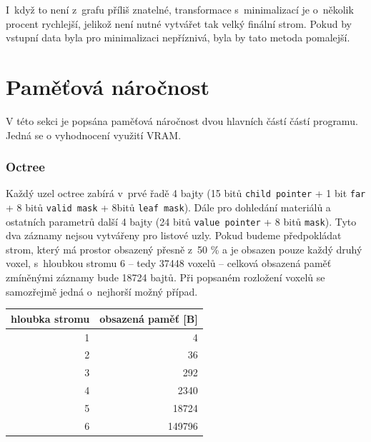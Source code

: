 I~když to není z~grafu příliš znatelné, transformace s~minimalizací je o~několik procent rychlejší, jelikož není nutné vytvářet tak velký finální strom. Pokud by vstupní data byla pro minimalizaci nepříznivá, byla by tato metoda pomalejší.

\section{Paměťová náročnost}
V této sekci je popsána paměťová náročnost dvou hlavních částí částí programu. Jedná se o vyhodnocení využití VRAM.

\subsubsection{Octree}

Každý uzel octree zabírá v~prvé řadě 4 bajty (15 bitů \texttt{child pointer} + 1 bit \texttt{far} + 8 bitů \texttt{valid mask} + 8bitů \texttt{leaf mask}). Dále pro dohledání materiálů a ostatních parametrů další 4 bajty (24 bitů \texttt{value pointer} + 8 bitů \texttt{mask}). Tyto dva záznamy nejsou vytvářeny pro listové uzly. Pokud budeme předpokládat strom, který má prostor obsazený přesně z~50 \% a je obsazen pouze každý druhý voxel, s~hloubkou stromu 6 -- tedy 37448 voxelů -- celková obsazená paměť zmíněnými záznamy bude 18724 bajtů. Při popsaném rozložení voxelů se samozřejmě jedná o~nejhorší možný případ.

\begin{table}[H]
	\centering
	\begin{tabular}{|r|r|}
		\hline
		\multicolumn{1}{|c|}{hloubka stromu} & \multicolumn{1}{c|}{obsazená paměť {[}B{]}} \\ \hline
		1                                    & 4                                           \\ \hline
		2                                    & 36                                          \\ \hline
		3                                    & 292                                         \\ \hline
		4                                    & 2340                                        \\ \hline
		5                                    & 18724                                       \\ \hline
		6                                    & 149796                                      \\ \hline
	\end{tabular}
	\captionsetup{justification=centering}
\end{table}

